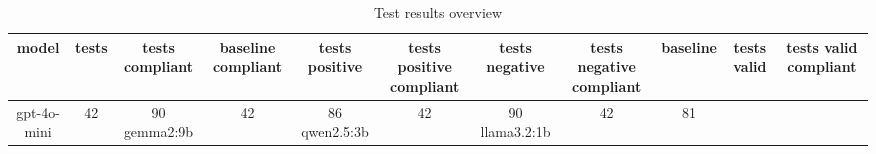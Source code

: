 
  \begin{table}[h!]
  \centering
  \begin{tabular}{|c|c|c|c|c|c|c|c|c|c|c|}
  \hline
  model & tests & tests compliant & baseline compliant & tests positive & tests positive compliant & tests negative & tests negative compliant & baseline & tests valid & tests valid compliant \\
  \hline
  gpt-4o-mini & 42 & 90%
\hline
gemma2:9b & 42 & 86%
\hline
qwen2.5:3b & 42 & 90%
\hline
llama3.2:1b & 42 & 81%
  \end{tabular}
  \caption{Test results overview}
  
  \end{table}
  